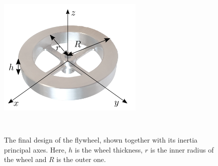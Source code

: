 \documentclass[sensors,article,submit,pdftex,moreauthors]{Definitions/mdpi}
\begin{document}
\begin{figure}[t!]
	\centering
	\includegraphics[width=7cm,height=8cm,keepaspectratio]{figures/flywheel_opaque.png}
	\caption{\small The final design of the flywheel, shown together with its inertia principal axes. Here, $h$ is the wheel thickness, $r$ is the inner radius of the wheel and $R$ is the outer one.}
	\label{fig:flywheel}
\end{figure}
\unskip
\end{document}
